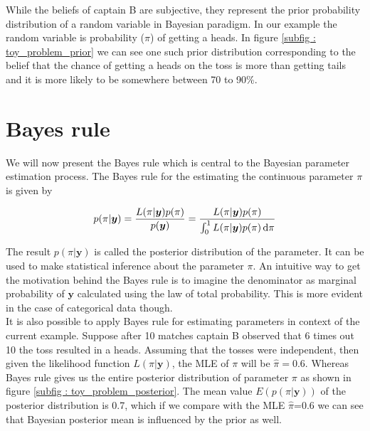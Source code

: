 While the beliefs of captain B are subjective, they represent the prior probability distribution of a random variable in Bayesian paradigm. In our example the random variable is probability ($\pi$) of getting a heads. In figure \ref{subfig : toy_problem_prior} we can see one such prior distribution corresponding to the belief that the chance of getting a heads on the toss is more than getting tails and it is more likely to be somewhere between 70 to 90\%.

\section{Bayes rule}
\label{sec : bayes_rule}
We will now present the Bayes rule which is central to the Bayesian parameter estimation process. The Bayes rule for the estimating the continuous parameter $\pi$ is given by

\begin{equation}
\label{eq : bayes_rule}
p(\pi|\boldsymbol{y}) = \dfrac{L(\pi|\boldsymbol{y})p(\pi)}{p(\boldsymbol{y})} = \dfrac{L(\pi|\boldsymbol{y})p(\pi)}{\int_{0}^{1}L(\pi|\boldsymbol{y})p(\pi)\mathop{}\!\mathrm{d}\pi}
\end{equation}

The result $p(\pi|\boldsymbol{y})$ is called the posterior distribution of the parameter. It can be used to make statistical inference about the parameter $\pi$. An intuitive way to get the motivation behind the Bayes rule is to imagine the denominator as marginal probability of $\boldsymbol{y}$ calculated using the law of total probability. This is more evident in the case of categorical data though.\\

It is also possible to apply Bayes rule for estimating parameters in context of the current example. Suppose after 10 matches captain B observed that 6 times out 10 the toss resulted in a heads. Assuming that the tosses were independent, then given the likelihood function $L(\pi|\boldsymbol{y})$, the MLE of $\pi$ will be $\hat{\pi} = 0.6$. Whereas Bayes rule gives us the entire posterior distribution of parameter $\pi$ as shown in figure \ref{subfig : toy_problem_posterior}. The mean value $E(p(\pi|\boldsymbol{y}))$ of the posterior distribution is 0.7, which if we compare with the MLE $\hat{\pi}$=0.6 we can see that Bayesian posterior mean is influenced by the prior as well.

